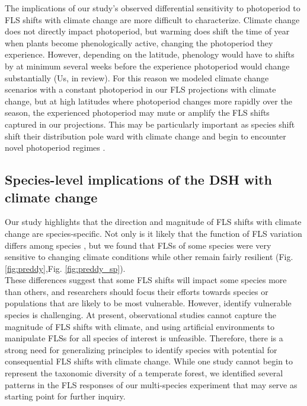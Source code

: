 \documentclass[11pt]{article}\usepackage[]{graphicx}\usepackage[]{color}
\begin{document}
\noindent The implications of our study's observed differential sensitivity to photoperiod to FLS shifts with climate change are more difficult to characterize.  Climate change does not directly impact photoperiod, but warming does shift the time of year when plants become phenologically active, changing the photoperiod they experience. However, depending on the latitude, phenology would have to shifts by at minimum several weeks before the experience photoperiod would change substantially \citep{}(Us, in review). For this reason we modeled climate change scenarios with a constant photoperiod in our FLS projections with climate change, but at high latitudes where photoperiod changes more rapidly over the season, the experienced photoperiod may mute or amplify the FLS shifts captured in our projections. This may be particularly important as species shift shift their distribution pole ward with climate change and begin to encounter novel photoperiod regimes \citep{WAY:2015aa}.\\

\subsection*{Species-level implications of the DSH with climate change}
\noindent  Our study highlights that the direction and magnitude of FLS shifts with climate change are species-specific. Not only is it likely that the function of FLS variation differs among species \citep{Buonaiuto2020}, but we found that FLSs of some species were very sensitive to changing climate conditions while other remain fairly resilient (Fig. \ref{fig:preddy},Fig. \ref{fig:preddy_sp}).\\

\noident These differences suggest that some FLS shifts will impact some species more than others, and researchers should focus their efforts towards species or populations that are likely to be most vulnerable. However, identify vulnerable species is challenging. At present, observational studies cannot capture the magnitude of FLS shifts with climate, and using artificial environments to manipulate FLSs for all species of interest is unfeasible. Therefore, there is a strong need for generalizing principles to identify species with potential for consequential FLS shifts with climate change. While one study cannot begin to represent the taxonomic diversity of a temperate forest, we identified several patterns in the FLS responses of our multi-species experiment that may serve as starting point for further inquiry.\\
\end{document}
